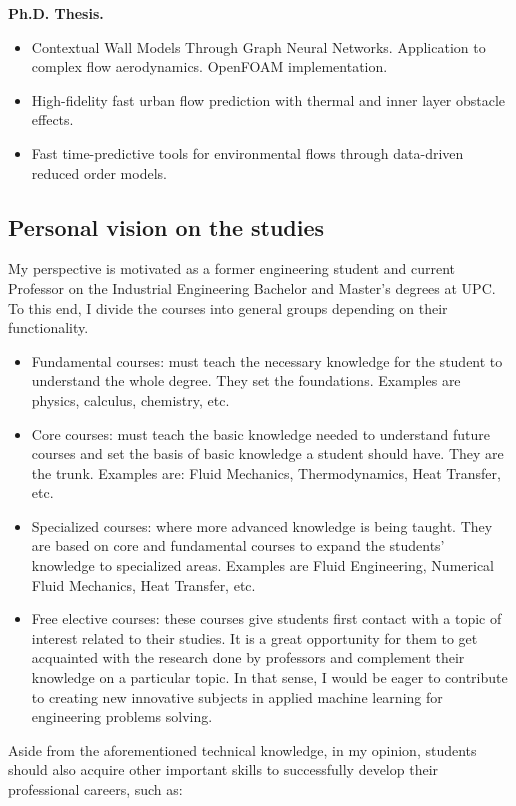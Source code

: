 \documentclass{article}
\begin{document}
{\bf Ph.D. Thesis.}

\begin{itemize}[noitemsep]
\item Contextual Wall Models Through Graph Neural Networks. Application to complex flow aerodynamics. OpenFOAM implementation.
\item High-fidelity fast urban flow prediction with thermal and inner layer obstacle effects.
\item Fast time-predictive tools for environmental flows through data-driven reduced order models. 
\end{itemize}

\subsection{Personal vision on the studies}

My perspective is motivated as a former engineering student and current Professor on the Industrial Engineering Bachelor and Master's degrees at UPC. To this end, I divide the courses into general groups depending on their functionality.

\begin{itemize}
\item Fundamental courses: must teach the necessary knowledge for the student to understand the whole degree. They set the foundations. Examples are physics, calculus, chemistry, etc.
\item Core courses: must teach the basic knowledge needed to understand future courses and set the basis of basic knowledge a student should have. They are the trunk. Examples are:
Fluid Mechanics, Thermodynamics, Heat Transfer, etc.
\item Specialized courses: where more advanced knowledge is being taught. They are based on core and fundamental courses to expand the students' knowledge to specialized areas. Examples are Fluid Engineering, Numerical Fluid Mechanics, Heat Transfer, etc.
\item Free elective courses: these courses give students first contact with a topic of interest related to their studies. It is a great opportunity for them to get acquainted with the research done by professors and complement their knowledge on a particular topic. In that sense, I would be eager to contribute to creating new innovative subjects in applied machine learning for engineering problems solving. 
\end{itemize}

Aside from the aforementioned technical knowledge, in my opinion, students should also acquire other important skills to successfully develop their professional careers, such as:
\end{document}
